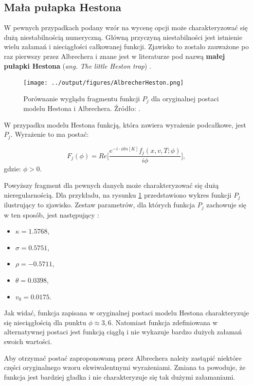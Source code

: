 \documentclass{pracamgr}
\begin{document}
\subsection{Mała pułapka Hestona} %
\label{sub:mala_pulapka_hestona}
W pewnych przypadkach podany wzór na wycenę opcji może charakteryzować się dużą niestabilnością
numeryczną. Główną przyczyną niestabilności jest istnienie wielu załamań i 
nieciągłości całkowanej funkcji. Zjawisko to zostało zauważone po raz pierwszy
przez Albrechera i znane jest w literaturze pod nazwą \textbf{małej pułapki Hestona} (\textit{ang. 
The little Heston trap}) \cite{albrecher2006little}.

\begin{figure}
\centering
  \texttt{[image: ../output/figures/AlbrecherHeston.png]}
  \caption{Porównanie wyglądu fragmentu funkcji $P_j$ dla oryginalnej 
           postaci modelu Hestona i Albrechera. Źródło: \cite{rouah2013heston}.}
  \label{fig:AlbrecherHeston}
\end{figure}
W przypadku modelu Hestona funkcją, która zawiera wyrażenie podcałkowe, jest $P_j$. 
Wyrażenie to ma postać:

\begin{equation}
\label{eq:HestonProb}
  F_j(\phi) = Re \bigg[ \frac{e^{-i \cdot \phi ln[K]} f_j(x, v, T; \phi) }{i \phi} \bigg], 
\end{equation}
gdzie: $\phi > 0$.

Powyższy fragment dla pewnych danych może charakteryzować się dużą nieregularnością. 
Dla przykładu, na rysunku \ref{fig:AlbrecherHeston} przedstawiono wykres 
funkcji $P_j$ ilustrujący to zjawisko. Zestaw parametrów, dla których funkcja $P_j$
zachowuje się w ten sposób, jest następujący \cite{rouah2013heston}:
\begin{itemize}
  \item $\kappa = 1.5768$,
  \item $\sigma = 0.5751$,
  \item $\rho = −0.5711$,
  \item $\theta = 0.0398$,
  \item $v_0 =0.0175$.
\end{itemize}

Jak widać, funkcja zapisana w oryginalnej postaci 
modelu Hestona charakteryzuje się nieciągłością dla punktu $\phi \approx 3,6$. 
Natomiast funkcja zdefiniowana w alternatywnej postaci jest funkcją ciągłą i nie wykazuje
bardzo dużych załamań swoich wartości.


Aby otrzymać postać zaproponowaną przez Albrechera należy zastąpić 
niektóre części oryginalnego wzoru ekwiwalentnymi wyrażeniami.
Zmiana ta powoduje, że funkcja jest bardziej gładka i nie charakteryzuje się tak dużymi
załamaniami.
\end{document}
